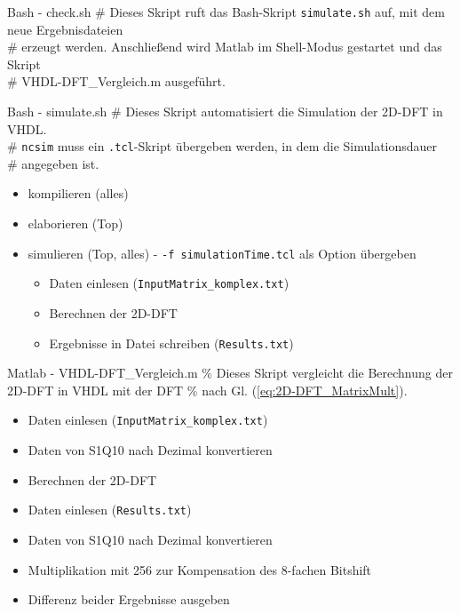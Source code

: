 \begin{mytextbox}{Bash - check.sh}
\vspace{0.5cm}
\# Dieses Skript ruft das Bash-Skript \texttt{simulate.sh} auf, mit dem neue Ergebnisdateien \\
\# erzeugt werden. Anschließend wird Matlab im Shell-Modus gestartet und das Skript \\
\# VHDL-DFT\_Vergleich.m ausgeführt.
\vspace{0.5cm}
 \begin{mytextbox}{Bash - simulate.sh}
 \vspace{0.5cm}
  \# Dieses Skript automatisiert die Simulation der 2D-DFT in VHDL.\\
  \# \texttt{ncsim} muss ein \texttt{.tcl}-Skript übergeben werden, in dem die Simulationsdauer \\ \# angegeben ist.
  
  \begin{itemize}
   \item kompilieren (alles)
   \item elaborieren (Top)
   \item simulieren (Top, alles) - \texttt{-f simulationTime.tcl} als Option übergeben
    \begin{itemize}
     \item Daten einlesen (\texttt{InputMatrix\_komplex.txt})
     \item Berechnen der 2D-DFT
     \item Ergebnisse in Datei schreiben (\texttt{Results.txt})
    \end{itemize}
    \vspace{0.5cm}
  \end{itemize}
 \end{mytextbox}
 \vspace{0.5cm}
 \begin{mytextbox}{Matlab - VHDL-DFT\_Vergleich.m}
\vspace{0.5cm}
  \% Dieses Skript vergleicht die Berechnung der 2D-DFT in VHDL mit der DFT 
  \% nach Gl. (\ref{eq:2D-DFT_MatrixMult}).
  
  \begin{itemize}
   \item Daten einlesen (\texttt{InputMatrix\_komplex.txt})
   \item Daten von S1Q10 nach Dezimal konvertieren
   \item Berechnen der 2D-DFT
   \item Daten einlesen (\texttt{Results.txt})
   \item Daten von S1Q10 nach Dezimal konvertieren
   \item Multiplikation mit 256 zur Kompensation des 8-fachen Bitshift
   \item Differenz beider Ergebnisse ausgeben
  \end{itemize}
 \end{mytextbox}
 \vspace{0.5cm}
\end{mytextbox}
